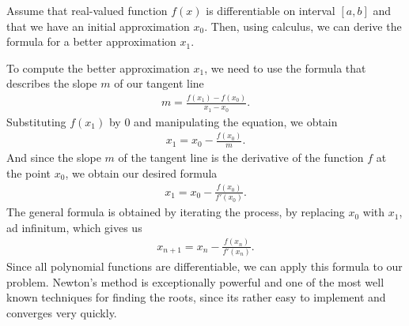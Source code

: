 \documentclass[
  digital, %
  table,   %
  nolof,     %
  nolot,     %
	draft, %
]{fithesis3}
\begin{document}
Assume that real-valued function $f(x)$ is differentiable on interval $[a,b]$ and that we have an initial approximation $x_{0}$. Then, using calculus, we can derive the formula for a better approximation $x_{1}$.


To compute the better approximation $x_{1}$, we need to use the formula that describes the slope $m$ of our tangent line
\begin{align}
      m = \frac{f(x_{1}) - f(x_{0})}{x_{1} - x_{0}}.
\end{align}
Substituting $f(x_{1})$ by $0$ and manipulating the equation, we obtain
\begin{align}
      x_{1} = x_{0} - \frac{f(x_{0})}{m}.
\end{align}
And since the slope $m$ of the tangent line is the derivative of the function $f$ at the point $x_{0}$, we obtain our desired formula 
\begin{align}
      x_{1} = x_{0} - \frac{f(x_{0})}{f'(x_{0})}.
\end{align}
The general formula is obtained by iterating the process, by replacing $x_{0}$ with $x_{1}$, ad infinitum, which gives us 
\begin{align}
      x_{n+1} = x_{n} - \frac{f(x_{n})}{f'(x_{n})}. \label{eq:newt}
\end{align}
Since all polynomial functions are differentiable, we can apply this formula to our problem. Newton's method is exceptionally powerful and one of the most well known techniques for finding the roots, since its rather easy to implement and converges very quickly. 
\end{document}

